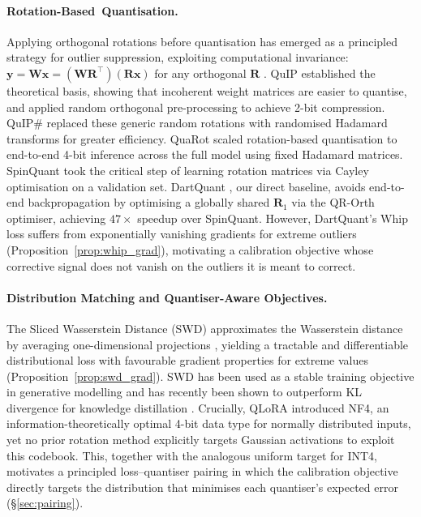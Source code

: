 \documentclass[11pt,a4paper]{article}
\begin{document}
\paragraph{\mbox{Rotation-Based Quantisation}.}
Applying orthogonal rotations before quantisation has emerged as a principled strategy for outlier suppression, exploiting computational invariance: $\mathbf{y} = \mathbf{W}\mathbf{x} = (\mathbf{W}\mathbf{R}^{\top})(\mathbf{R}\mathbf{x})$ for any orthogonal $\mathbf{R}$ \citep{quarot, spinquant, dartquant}.
QuIP \citep{quip} established the theoretical basis, showing that incoherent weight matrices are easier to quantise, and applied random orthogonal pre-processing to achieve 2-bit compression.
QuIP\# \citep{quipsharp} replaced these generic random rotations with randomised Hadamard transforms for greater efficiency.
QuaRot \citep{quarot} scaled rotation-based quantisation to end-to-end 4-bit inference across the full model using fixed Hadamard matrices.
SpinQuant \citep{spinquant} took the critical step of learning rotation matrices via Cayley optimisation on a validation set.
DartQuant \citep{dartquant}, our direct baseline, avoids end-to-end backpropagation by optimising a globally shared $\mathbf{R}_1$ via the QR-Orth optimiser, achieving $47\times$ speedup over SpinQuant.
However, DartQuant's Whip loss suffers from exponentially vanishing gradients for extreme outliers (Proposition~\ref{prop:whip_grad}), motivating a calibration objective whose corrective signal does not vanish on the outliers it is meant to correct.

\paragraph{Distribution Matching and Quantiser-Aware Objectives.}
The Sliced Wasserstein Distance (SWD) approximates the Wasserstein distance by averaging one-dimensional projections \citep{cuturi2013sinkhorn, wasserstein}, yielding a tractable and differentiable distributional loss with favourable gradient properties for extreme values (Proposition~\ref{prop:swd_grad}).
SWD has been used as a stable training objective in generative modelling \citep{deshpande2018, kolouri2019} and has recently been shown to outperform KL divergence for knowledge distillation \citep{lv2024wasserstein}.
Crucially, QLoRA \citep{qlora} introduced NF4, an information-theoretically optimal 4-bit data type for normally distributed inputs, yet no prior rotation method explicitly targets Gaussian activations to exploit this codebook.
This, together with the analogous uniform target for INT4, motivates a principled loss--quantiser pairing in which the calibration objective directly targets the distribution that minimises each quantiser's expected error (\S\ref{sec:pairing}).
\end{document}
